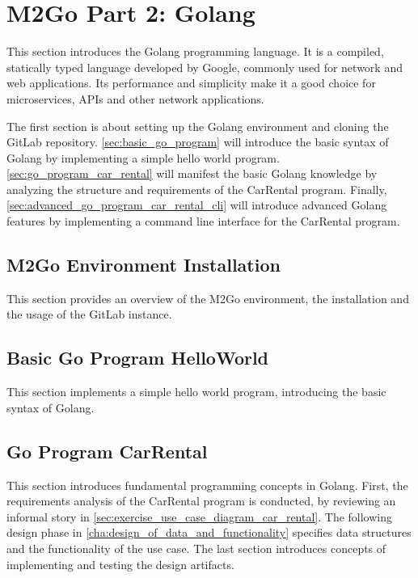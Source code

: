 \chapter{M2Go Part 2: Golang}
\label{cha:golang}
This section introduces the Golang programming language.
It is a compiled, statically typed language developed by Google, commonly used for network and web applications.
Its performance and simplicity make it a good choice for microservices, APIs and other network applications.

The first section is about setting up the Golang environment and cloning the GitLab repository.
\autoref{sec:basic_go_program} will introduce the basic syntax of Golang by implementing a simple hello world program.
\autoref{sec:go_program_car_rental} will manifest the basic Golang knowledge by analyzing the structure and requirements of the CarRental program.
Finally, \autoref{sec:advanced_go_program_car_rental_cli} will introduce advanced Golang features by implementing a command line interface for the CarRental program.


\section{M2Go Environment Installation}
\label{sec:m2go_env_installation}
This section provides an overview of the M2Go environment, the installation and the usage of the GitLab instance.




\section{Basic Go Program HelloWorld}
\label{sec:basic_go_program}
This section implements a simple hello world program, introducing the basic syntax of Golang.




\section{Go Program CarRental}
\label{sec:go_program_car_rental}
This section introduces fundamental programming concepts in Golang.
First, the requirements analysis of the CarRental program is conducted, by reviewing an informal story in \autoref{sec:exercise_use_case_diagram_car_rental}.
The following design phase in \autoref{cha:design_of_data_and_functionality} specifies data structures and the functionality of the use case.
The last section introduces concepts of implementing and testing the design artifacts.

